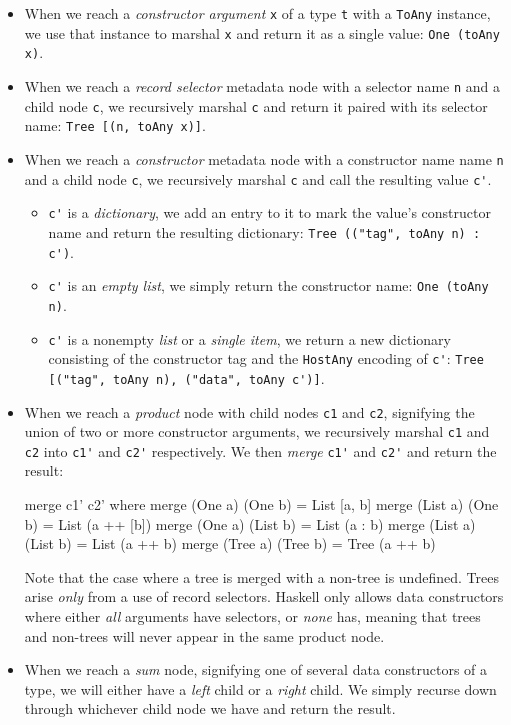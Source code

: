 \documentclass{sigplanconf}
\begin{document}
\begin{itemize}
\item
  When we reach a \emph{constructor argument} \lstinline!x! of a type
  \lstinline!t! with a \lstinline!ToAny! instance, we use that instance to
  marshal \lstinline!x! and return it as a single value:
  \lstinline!One (toAny x)!.
\item
  When we reach a \emph{record selector} metadata node with a selector
  name \lstinline!n! and a child node \lstinline!c!, we recursively marshal
  \lstinline!c! and return it paired with its selector name:
  \lstinline!Tree [(n, toAny x)]!.
\item
  When we reach a \emph{constructor} metadata node with a constructor name
  name \lstinline!n! and a child node \lstinline!c!, we recursively marshal
  \lstinline!c! and call the resulting value \lstinline!c'!.
  \begin{itemize}
  \item
    \lstinline!c'! is a \emph{dictionary}, we add an entry to it to mark the
    value's constructor name and return the resulting dictionary:
    \lstinline!Tree (("tag", toAny n) : c')!.
  \item
    \lstinline!c'! is an \emph{empty list}, we simply return the constructor
    name:
    \lstinline!One (toAny n)!.
  \item
    \lstinline!c'! is a nonempty \emph{list} or a \emph{single item},
    we return a new dictionary consisting of the constructor tag and the
    \lstinline!HostAny! encoding of \lstinline!c'!:
    \lstinline!Tree [("tag", toAny n), ("data", toAny c')]!.
  \end{itemize}
\item
  When we reach a \emph{product} node with child nodes \lstinline!c1! and
  \lstinline!c2!, signifying the union of two or more constructor arguments,
  we recursively marshal \lstinline!c1! and \lstinline!c2! into
  \lstinline!c1'! and \lstinline!c2'! respectively. We then \emph{merge}
  \lstinline!c1'! and \lstinline!c2'! and return the result:

  \begin{code}
    merge c1' c2'
      where
        merge (One a) (One b)   = List [a, b]
        merge (List a) (One b)  = List (a ++ [b])
        merge (One a) (List b)  = List (a : b)
        merge (List a) (List b) = List (a ++ b)
        merge (Tree a) (Tree b) = Tree (a ++ b)
  \end{code}

  Note that the case where a tree is merged with a non-tree is undefined.
  Trees arise \emph{only} from a use of record selectors. Haskell only
  allows data constructors where either \emph{all} arguments have selectors,
  or \emph{none} has, meaning that trees and non-trees will never appear in
  the same product node.
\item
  When we reach a \emph{sum} node, signifying one of several data constructors
  of a type, we will either have a \emph{left} child or a \emph{right} child.
  We simply recurse down through whichever child node we have and return the
  result.
\end{itemize}
\end{document}
